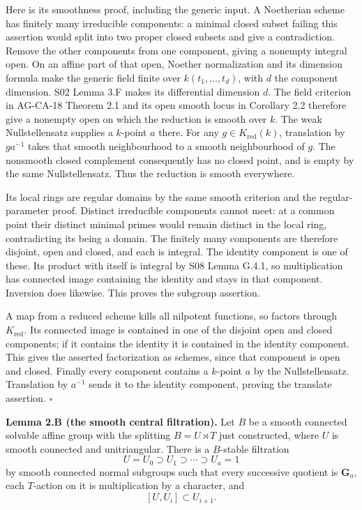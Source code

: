 \documentclass[11pt,a4paper,openany]{report}
\newcounter{none}
\begin{document}
Here is its smoothness proof, including the generic input. A Noetherian scheme has finitely many irreducible components: a minimal closed subset failing this assertion would split into two proper closed subsets and give a contradiction. Remove the other components from one component, giving a nonempty integral open. On an affine part of that open, Noether normalization and its dimension formula make the generic field finite over \(k(t_1,\ldots,t_d)\), with \(d\) the component dimension. S02 Lemma 3.F makes its differential dimension \(d\). The field criterion in AG-CA-18 Theorem 2.1 and its open smooth locus in Corollary 2.2 therefore give a nonempty open on which the reduction is smooth over \(k\). The weak Nullstellensatz supplies a \(k\)-point \(a\) there. For any \(g\in K_{\mathrm{red}}(k)\), translation by \(ga^{-1}\) takes that smooth neighbourhood to a smooth neighbourhood of \(g\). The nonsmooth closed complement consequently has no closed point, and is empty by the same Nullstellensatz. Thus the reduction is smooth everywhere.

Its local rings are regular domains by the same smooth criterion and the regular-parameter proof. Distinct irreducible components cannot meet: at a common point their distinct minimal primes would remain distinct in the local ring, contradicting its being a domain. The finitely many components are therefore disjoint, open and closed, and each is integral. The identity component is one of these. Its product with itself is integral by S08 Lemma G.4.1, so multiplication has connected image containing the identity and stays in that component. Inversion does likewise. This proves the subgroup assertion.

A map from a reduced scheme kills all nilpotent functions, so factors through \(K_{\mathrm{red}}\). Its connected image is contained in one of the disjoint open and closed components; if it contains the identity it is contained in the identity component. This gives the asserted factorization as schemes, since that component is open and closed. Finally every component contains a \(k\)-point \(a\) by the Nullstellensatz. Translation by \(a^{-1}\) sends it to the identity component, proving the translate assertion. \(\square\)

\textbf{Lemma 2.B (the smooth central filtration).} Let \(B\) be a smooth connected solvable affine group with the splitting \(B=U\rtimes T\) just constructed, where \(U\) is smooth connected and unitriangular. There is a \(B\)-stable filtration \[
U=U_0\supset U_1\supset\cdots\supset U_a=1
\] by smooth connected normal subgroups such that every successive quotient is \(\mathbf G_a\), each \(T\)-action on it is multiplication by a character, and \[
[U,U_i]\subset U_{i+1}.
\]
\end{document}
